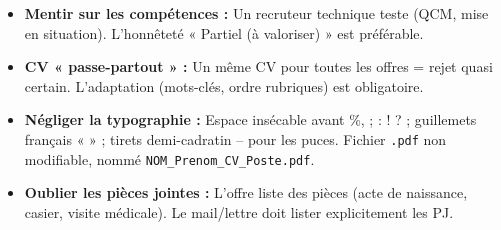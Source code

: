 \documentclass[11pt]{article}
\begin{document}
\begin{attention}
\begin{itemize}
    \item \textbf{Mentir sur les compétences :} Un recruteur technique teste (QCM, mise en situation). L'honnêteté « Partiel (à valoriser) » est préférable.
    \item \textbf{CV « passe-partout » :} Un même CV pour toutes les offres = rejet quasi certain. L'adaptation (mots-clés, ordre rubriques) est obligatoire.
    \item \textbf{Négliger la typographie :} Espace insécable avant \%, ; : ! ? ; guillemets français « » ; tirets demi-cadratin -- pour les puces. Fichier \texttt{.pdf} non modifiable, nommé \texttt{NOM\_Prenom\_CV\_Poste.pdf}.
    \item \textbf{Oublier les pièces jointes :} L'offre liste des pièces (acte de naissance, casier, visite médicale). Le mail/lettre doit lister explicitement les PJ.
\end{itemize}
\end{attention}
\end{document}
